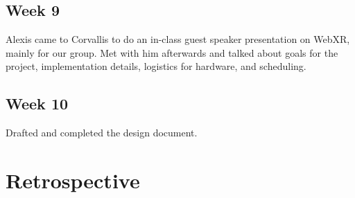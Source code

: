 \documentclass[onecolumn, draftclsnofoot,10pt, compsoc]{IEEEtran}
\begin{document}
\subsection{Week 9}
Alexis came to Corvallis to do an in-class guest speaker presentation on WebXR, mainly for our group. Met with him afterwards and talked about goals for the project, implementation details, logistics for hardware, and scheduling.
\subsection{Week 10}
Drafted and completed the design document.

\section{Retrospective}
\centering %
\end{document}
